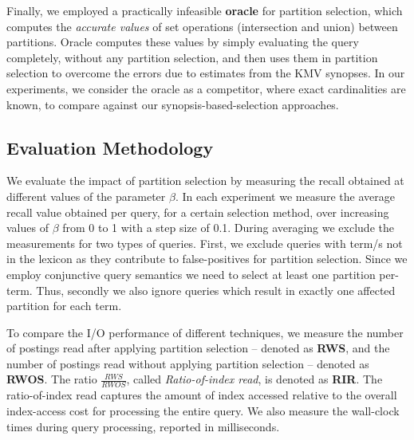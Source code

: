 Finally, we employed a practically infeasible {\bf oracle} for partition
selection, which computes the \emph{accurate values} of set operations
(intersection and union) between partitions. Oracle computes these
values by simply evaluating the query completely, without any
partition selection, and then uses them in partition selection to overcome the errors due to estimates from the KMV synopses. 
In our experiments, we consider the oracle as a competitor, where  exact cardinalities are known, to compare against our synopsis-based-selection approaches. 

\subsection{Evaluation Methodology}

We evaluate the impact of partition selection by measuring the recall obtained at different values of the parameter $\beta$. In each experiment we measure the average recall value obtained per query, for a certain selection method, over increasing values of $\beta$ from 0 to 1 with a step size of 0.1. During averaging we exclude the measurements for two types of queries. First, we exclude queries with term/s not in the lexicon as they contribute to false-positives for partition selection. Since we employ conjunctive query semantics we need to select at least one partition per-term. Thus, secondly we also ignore queries which result in exactly one affected partition for each term.

To compare the I/O performance of different techniques, we measure the
number of postings read after applying partition selection --
denoted as {\bf RWS}, and the number of postings read without
applying partition selection -- denoted as {\bf RWOS}. The ratio
$\frac{RWS}{RWOS}$, called \emph{Ratio-of-index read}, is denoted as
{\bf RIR}. The ratio-of-index read captures the amount of index accessed relative to the overall index-access cost for processing the entire query. We also measure the wall-clock times during query processing, reported in milliseconds.


